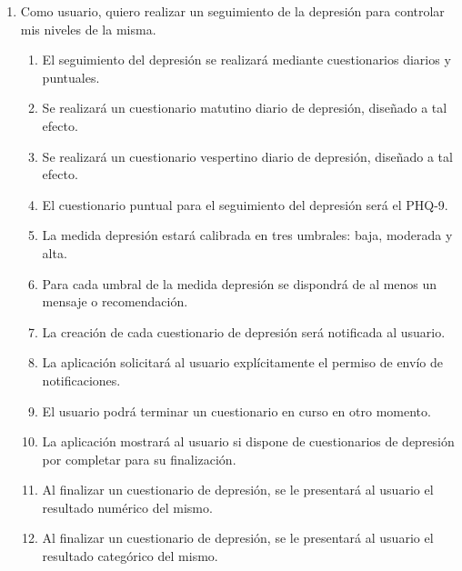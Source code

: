         \begin{enumerate}[resume=req-usuario,label=\textbf{\texttt{RU-\arabic*}}]
            \item Como usuario, quiero realizar un seguimiento de la depresión para controlar mis niveles de la misma.
            \begin{enumerate}[resume=req-funcionales,label=\textbf{\texttt{RF-\arabic*}}]
                \item El seguimiento del depresión se realizará mediante cuestionarios diarios y puntuales.
                \item Se realizará un cuestionario matutino diario de depresión, diseñado a tal efecto.
                \item Se realizará un cuestionario vespertino diario de depresión, diseñado a tal efecto.
                \item El cuestionario puntual para el seguimiento del depresión será el PHQ-9.
                \item La medida depresión estará calibrada en tres umbrales: baja, moderada y alta.
                \item Para cada umbral de la medida depresión se dispondrá de al menos un mensaje o recomendación.
                \item La creación de cada cuestionario de depresión será notificada al usuario.
                \item La aplicación solicitará al usuario explícitamente el permiso de envío de notificaciones.
                \item El usuario podrá terminar un cuestionario en curso en otro momento.
                \item La aplicación mostrará al usuario si dispone de cuestionarios de depresión por completar para su finalización.
                \item Al finalizar un cuestionario de depresión, se le presentará al usuario el resultado numérico del mismo.
                \item Al finalizar un cuestionario de depresión, se le presentará al usuario el resultado categórico del mismo.
            \end{enumerate}
        \end{enumerate}
